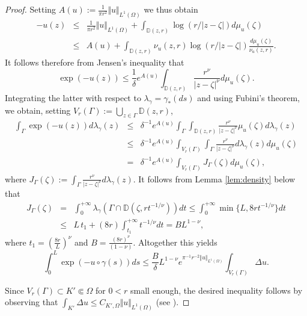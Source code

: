 \documentclass[a4paper,11pt,leqno,english]{smfart}
\theoremstyle{plain}
\theoremstyle{plain}
\numberwithin{equation}{section} %
\numberwithin{figure}{section} %
\theoremstyle{plain}
\theoremstyle{plain}
\theoremstyle{remark}
\theoremstyle{remark}
\theoremstyle{definition}
\theoremstyle{plain}
\theoremstyle{plain}
\theoremstyle{definition}
\begin{document}
\begin{proof}
Setting $A (u) := \frac{1}{\pi r^2} \Vert u\Vert_{L^1(\Omega)}$
we thus obtain  
\begin{eqnarray*} 
 - u(z) &\leq & \frac{1}{\pi r^2} \Vert u\Vert_{L^1(\Omega)}   + \int_{{\mathbb D }(z,r)} \log (r\slash \vert z - \zeta\vert)  d\mu_u(\zeta) \\
 & \leq &  A(u) +  \int_{{\mathbb D }(z,r)} \nu_u(z,r) \log (r\slash \vert z - \zeta\vert)  \frac{d\mu_u(\zeta)}{\nu_u(z,r)}.
\end{eqnarray*}
It follows therefore from Jensen's inequality that
$$
\exp (- u (z)) \leq    \frac{1}{\delta}  e^{A (u)}\int_{{\mathbb D }(z,r)}  \frac{r^{\nu}}{ \vert z - \zeta\vert^\nu}   d \mu_u(\zeta).
$$
 Integrating the latter with respect to  $\lambda_\gamma=\gamma_*(ds)$
 and using Fubini's theorem, we obtain,
 setting $V_r(\Gamma) := \bigcup_{z\in \Gamma} {\mathbb D }(z,r)$,
  \begin{eqnarray*}
\int_\Gamma  \exp (- u (z) ) d \lambda_\gamma (z) 
&\leq & \delta^{-1}  e^{A(u)} \int_\Gamma   \int_{{\mathbb D }(z,r)}  \frac{r^{\nu}}{ \vert z - \zeta\vert^\nu} \mu_u(\zeta) d\lambda_\gamma(z) \\
& \leq & \delta^{-1}  e^{A(u)}
 \int_{V_r(\Gamma)} \int_\Gamma \frac{r^{\nu}}{ \vert z - \zeta\vert^\nu} d \lambda_\gamma (z) d \mu_u(\zeta)\\
 & = & \delta^{-1}  e^{A(u)} \int_{V_r(\Gamma)} J_{\Gamma}(\zeta) d \mu_u(\zeta),
 \end{eqnarray*}
where
 $ J_\Gamma(\zeta) := \int_\Gamma \frac{r^{\nu}}{ \vert z - \zeta\vert^\nu} d \lambda_\gamma (z)  $.
It follows from Lemma \ref{lem:density} below that
\begin{eqnarray*}
   J_\Gamma (\zeta)    
   &=&  \int_0^{+\infty} \lambda_\gamma  (\Gamma \cap {\mathbb D }(\zeta, r t^{-1 \slash \nu})) d t 
  \leq   \int_0^{+\infty} \min \{L, 8 r t^{-1 \slash \nu}\} d t \\
  &\leq & L \, t_1  +   (8 r) \int_{t_1}^{+\infty}  t^{- 1 \slash \nu} d t = B L^{1-\nu},
\end{eqnarray*}
 where $t_1= (\frac{8 r}{L})^\nu$ and  $B=\frac{(8 r)^\nu}{(1-\nu)}$.
Altogether this yields
 $$
  \int_0^L  \exp (- u \circ \gamma(s) ) d s \leq \frac{B}{\delta} L^{1-\nu} e^{\pi^{-1} r^{-2} \Vert u\Vert_{L^1(\Omega)}} \int_{V_r(\Gamma)} \Delta u. 
$$

Since $V_r(\Gamma) \subset  K' \Subset \Omega$ for $0< r $ small enough,
the desired inequality follows by observing that $\int_{K'} \Delta u \leq C_{K',\Omega} \Vert u\Vert_{L^1(\Omega)}$
(see \cite[Theorem 3.9]{GZbook}).
   \end{proof} 
 
\end{document}

